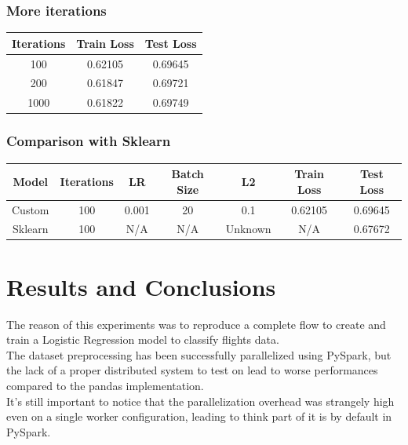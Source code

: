 \documentclass[
	letterpaper, %
	10pt, %
]{class}
\begin{document}
\subsubsection{More iterations}

\begin{center}
    \begin{tabular}{ |c|c|c| }
        \hline
        Iterations & Train Loss & Test Loss \\
        \hline
        100        & 0.62105    & 0.69645   \\
        200        & 0.61847    & 0.69721   \\
        1000       & 0.61822    & 0.69749   \\
        \hline
    \end{tabular}
\end{center}

\subsubsection{Comparison with Sklearn}

\begin{center}
    \begin{tabular}{ |c|c|c|c|c|c|c| }
        \hline
        Model   & Iterations & LR    & Batch Size & L2      & Train Loss & Test Loss \\
        \hline
        Custom  & 100        & 0.001 & 20         & 0.1     & 0.62105    & 0.69645   \\
        Sklearn & 100        & N/A   & N/A        & Unknown & N/A        & 0.67672   \\
        \hline
    \end{tabular}
\end{center}



\section{Results and Conclusions}

The reason of this experiments was to reproduce a complete flow to create and train a Logistic Regression model to classify flights data.\\
The dataset preprocessing has been successfully parallelized using PySpark, but the lack of a proper distributed system to test on lead to worse performances compared to the pandas implementation.\\
It's still important to notice that the parallelization overhead was strangely high even on a single worker configuration, leading to think part of it is by default in PySpark.\\
\end{document}
